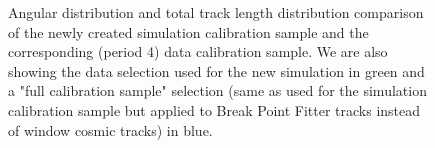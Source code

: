\documentclass[12pt]{article}
\begin{document}
\begin{figure}[!ht]

\caption{Angular distribution and total track length distribution comparison of the newly created simulation calibration sample and the corresponding (period 4) data calibration sample. We are also showing the data selection used for the new simulation in green and a "full calibration sample" selection (same as used for the simulation calibration sample but applied to Break Point Fitter tracks instead of window cosmic tracks) in blue.}
\label{figDataMCComparison_cosZtotLength}
\end{figure}
\end{document}
